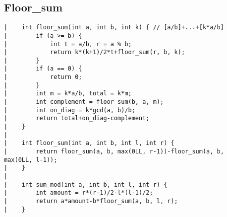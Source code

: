 \documentclass[a4paper, 10pt]{article}
\begin{document}
\begin{center}
\section*{Floor\_sum}
\begin{verbatim}
|    int floor_sum(int a, int b, int k) { // [a/b]+...+[k*a/b]
|        if (a >= b) {
|            int t = a/b, r = a % b;
|            return k*(k+1)/2*t+floor_sum(r, b, k);
|        }
|        if (a == 0) {
|            return 0;
|        }
|        int m = k*a/b, total = k*m;
|        int complement = floor_sum(b, a, m);
|        int on_diag = k*gcd(a, b)/b;
|        return total+on_diag-complement;
|    }
|    
|    int floor_sum(int a, int b, int l, int r) {
|        return floor_sum(a, b, max(0LL, r-1))-floor_sum(a, b, max(0LL, l-1));
|    }
|    
|    int sum_mod(int a, int b, int l, int r) {
|        int amount = r*(r-1)/2-l*(l-1)/2;
|        return a*amount-b*floor_sum(a, b, l, r);
|    }
\end{verbatim}


\end{center}
\end{document}
